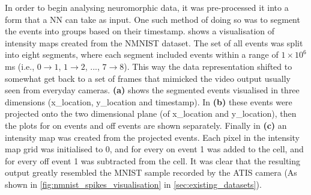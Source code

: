 In order to begin analysing neuromorphic data, it was pre-processed it into a form that a NN can take as input. One such method of doing so was to segment the events into groups based on their timestamp.  shows a visualisation of intensity maps created from the NMNIST\cite{NMNIST} dataset. The set of all events was split into eight segments, where each segment included events within a range of $ 1 \times 10^6 $ ms (i.e., $ 0 \rightarrow 1 $, $ 1 \rightarrow 2 $, ..., $ 7 \rightarrow 8 $). This way the data representation shifted to somewhat get back to a set of frames that mimicked the video output usually seen from everyday cameras. \textbf{(a)} shows the segmented events visualised in three dimensions (x\_location, y\_location and timestamp). In \textbf{(b)} these events were projected onto the two dimensional plane (of x\_location and y\_location), then the plots for on events and off events are shown separately. Finally in \textbf{(c)} an intensity map was created from the projected events. Each pixel in the intensity map grid was initialised to 0, and for every on event 1 was added to the cell, and for every off event 1 was subtracted from the cell. It was clear that the resulting output greatly resembled the MNIST\cite{MNIST} sample recorded by the ATIS camera (As shown in \cref{fig:nmnist_spikes_visualisation} in \cref{sec:existing_datasets}).

